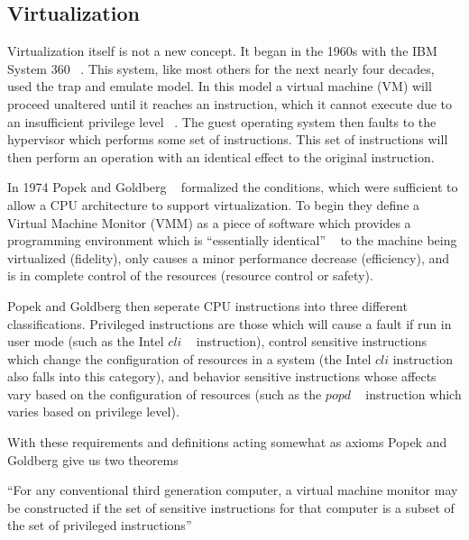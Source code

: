 \subsection{Virtualization}

Virtualization itself is not a new concept. It began in the 1960s with the IBM System 360 ~\cite{vleck_ibm_2010}. This system, like most others for the next nearly four decades, used the trap and emulate model. In this model a virtual machine (VM) will proceed unaltered until it reaches an instruction, which it cannot execute due to an insufficient privilege level ~\cite{popek_formal_1974}. The guest operating system then faults to the hypervisor which performs some set of instructions. This set of instructions will then perform an operation with an identical effect to the original instruction. 

In 1974 Popek and Goldberg ~\cite{popek_formal_1974} formalized the conditions, which were sufficient to allow a CPU architecture to support virtualization. To begin they define a Virtual Machine Monitor (VMM) as a piece of software which provides a programming environment which is ``essentially identical'' ~\cite{popek_formal_1974} to the machine being virtualized (fidelity), only causes a minor performance decrease (efficiency), and is in complete control of the resources (resource control or safety).

Popek and Goldberg then seperate CPU instructions into three different classifications.  Privileged instructions are those which will cause a fault if run in user mode (such as the Intel $cli$ ~\cite{_intel_2015} instruction), control sensitive instructions which change the configuration of resources in a system (the Intel $cli$ instruction also falls into this category),  and behavior sensitive instructions whose affects vary based on the configuration of resources (such as the $popd$ ~\cite{_intel_2015} instruction which varies based on privilege level).

With these requirements and definitions acting somewhat as axioms Popek and Goldberg give us two theorems ~\cite{popek_formal_1974}



 \begin{theorem}
 \label{Popek I}
 {\tabularnewline
 ``For any conventional third generation computer, a virtual machine monitor may be constructed if the set of sensitive instructions for that computer is a subset of the set of privileged instructions'' ~\cite{popek_formal_1974}
 }
 \end{theorem}


